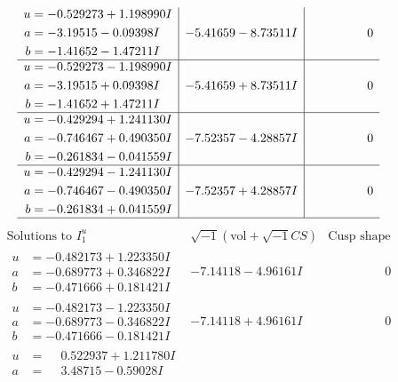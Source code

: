 \documentclass[1p]{elsarticle_modified}
\theoremstyle{definition}
\newcommand{\I}{\sqrt{-1}}
\begin{document}
$$\begin{array}{c|c|c}
\begin{aligned}
u &= -0.529273 + 1.198990 I \\
a &= -3.19515 - 0.09398 I \\
b &= -1.41652 - 1.47211 I\end{aligned}
 & -5.41659 - 8.73511 I & \phantom{-0.000000 } 0 \\ \hline\begin{aligned}
u &= -0.529273 - 1.198990 I \\
a &= -3.19515 + 0.09398 I \\
b &= -1.41652 + 1.47211 I\end{aligned}
 & -5.41659 + 8.73511 I & \phantom{-0.000000 } 0 \\ \hline\begin{aligned}
u &= -0.429294 + 1.241130 I \\
a &= -0.746467 + 0.490350 I \\
b &= -0.261834 - 0.041559 I\end{aligned}
 & -7.52357 - 4.28857 I & \phantom{-0.000000 } 0 \\ \hline\begin{aligned}
u &= -0.429294 - 1.241130 I \\
a &= -0.746467 - 0.490350 I \\
b &= -0.261834 + 0.041559 I\end{aligned}
 & -7.52357 + 4.28857 I & \phantom{-0.000000 } 0\\
 \hline 
 \end{array}$$\newpage$$\begin{array}{c|c|c}  
\text{Solutions to }I^u_{1}& \I (\text{vol} + \sqrt{-1}CS) & \text{Cusp shape}\\
 \hline 
\begin{aligned}
u &= -0.482173 + 1.223350 I \\
a &= -0.689773 + 0.346822 I \\
b &= -0.471666 + 0.181421 I\end{aligned}
 & -7.14118 - 4.96161 I & \phantom{-0.000000 } 0 \\ \hline\begin{aligned}
u &= -0.482173 - 1.223350 I \\
a &= -0.689773 - 0.346822 I \\
b &= -0.471666 - 0.181421 I\end{aligned}
 & -7.14118 + 4.96161 I & \phantom{-0.000000 } 0 \\ \hline\begin{aligned}
u &= \phantom{-}0.522937 + 1.211780 I \\
a &= \phantom{-}3.48715 - 0.59028 I \\

\end{aligned}
\end{array}$$
\end{document}
